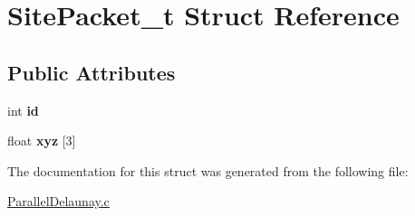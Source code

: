 \hypertarget{structSitePacket__t}{
\section{SitePacket\_\-t Struct Reference}
\label{structSitePacket__t}
}
\subsection*{Public Attributes}
\begin{DoxyCompactItemize}
\item 
\hypertarget{structSitePacket__t_ae47d103bc29880afdd805c045e605ecb}{
int {\bfseries id}}
\label{structSitePacket__t_ae47d103bc29880afdd805c045e605ecb}

\item 
\hypertarget{structSitePacket__t_ac71d90c283f81ad6d31b728cfae1effb}{
float {\bfseries xyz} \mbox{[}3\mbox{]}}
\label{structSitePacket__t_ac71d90c283f81ad6d31b728cfae1effb}

\end{DoxyCompactItemize}


The documentation for this struct was generated from the following file:\begin{DoxyCompactItemize}
\item 
\hyperlink{ParallelDelaunay_8c}{ParallelDelaunay.c}\end{DoxyCompactItemize}
